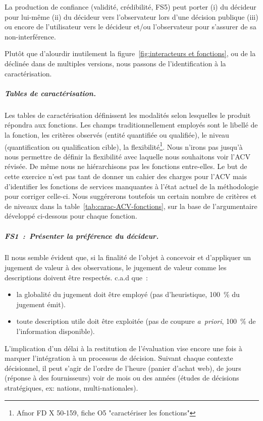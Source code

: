 La production de confiance (validité, crédibilité, FS5) peut porter (i) du décideur pour lui-même (ii) du décideur vers l'observateur lors d'une décision publique (iii) ou encore de l'utilisateur vers le décideur et/ou l'observateur pour s'assurer de sa non-interférence.

Plutôt que d'alourdir inutilement la figure~\ref{fig:interacteurs et fonctions}, ou de la déclinée dans de multiples versions, nous passons de l'identification à la caractérisation.

\subparagraph{Tables de caractérisation.}
Les tables de caractérisation définissent les modalités selon lesquelles le produit répondra aux fonctions.
Les champs traditionnellement employés sont le libellé de la fonction, les critères observés (entité quantifiée ou qualifiée), le niveau (quantification ou qualification cible), la flexibilité\footnote{Afnor FD X 50-159, fiche O5 "caractériser les fonctions"}.
Nous n'irons pas jusqu'à nous permettre de définir la flexibilité avec laquelle nous souhaitons voir l'\gls{ACV} révisée.
De même nous ne hiérarchisons pas les fonctions entre-elles.
Le but de cette exercice n'est pas tant de donner un cahier des charges pour l'\gls{ACV} mais d'identifier les fonctions de services manquantes à l'état actuel de la méthodologie pour corriger celle-ci.
Nous suggérerons toutefois un certain nombre de critères et de niveaux dans la table~\ref{tab:carac-ACV-fonctions}, sur la base de l'argumentaire développé ci-dessous pour chaque fonction.

\subparagraph{FS1~:~Présenter la préférence du décideur.}
Il nous semble évident que, si la finalité de l'objet à concevoir et d'appliquer un jugement de valeur à des observations, le jugement de valeur comme les descriptions doivent être respectés.
c.a.d que~:
\begin{itemize}
\item la globalité du jugement doit être employé (pas d'heuristique, 100~\% du jugement émit).
\item toute description utile doit être exploitée (pas de coupure \textit{a~priori}, 100~\% de l'information disponible).
\end{itemize} 
L'implication d'un délai à la restitution de l'évaluation vise encore une fois à marquer l'intégration à un processus de décision.
Suivant chaque contexte décisionnel, il peut s'agir de l'ordre de l'heure (panier d'achat web), de jours (réponse à des fournisseurs) voir de mois ou des années (études de décisions stratégiques, ex: nations, multi-nationales).

